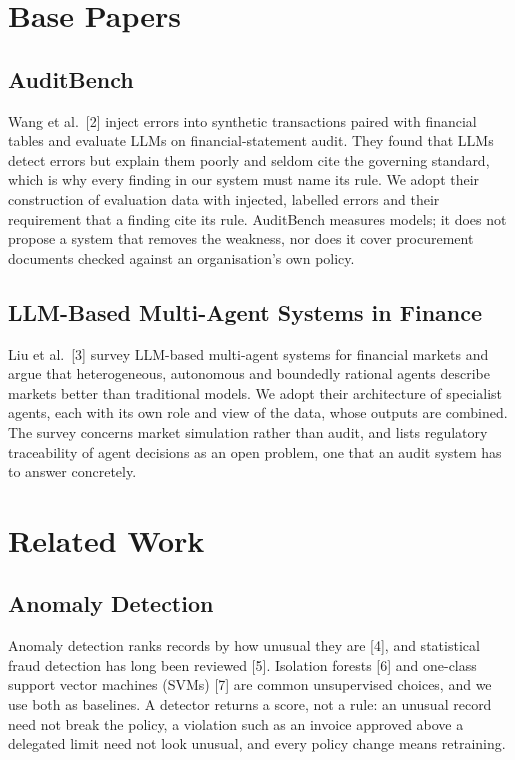 \documentclass[9pt,a4paper,twocolumn]{extarticle}
\begin{document}
\section{Base Papers}
\subsection{AuditBench}
Wang et al.~[2] inject errors into synthetic transactions paired with financial tables and evaluate LLMs on financial-statement audit. They found that LLMs detect errors but explain them poorly and seldom cite the governing standard, which is why every finding in our system must name its rule. We adopt their construction of evaluation data with injected, labelled errors and their requirement that a finding cite its rule. AuditBench measures models; it does not propose a system that removes the weakness, nor does it cover procurement documents checked against an organisation's own policy.

\subsection{LLM-Based Multi-Agent Systems in Finance}
Liu et al.~[3] survey LLM-based multi-agent systems for financial markets and argue that heterogeneous, autonomous and boundedly rational agents describe markets better than traditional models. We adopt their architecture of specialist agents, each with its own role and view of the data, whose outputs are combined. The survey concerns market simulation rather than audit, and lists regulatory traceability of agent decisions as an open problem, one that an audit system has to answer concretely.

\section{Related Work}
\subsection{Anomaly Detection}
Anomaly detection ranks records by how unusual they are [4], and statistical fraud detection has long been reviewed [5]. Isolation forests [6] and one-class support vector machines (SVMs) [7] are common unsupervised choices, and we use both as baselines. A detector returns a score, not a rule: an unusual record need not break the policy, a violation such as an invoice approved above a delegated limit need not look unusual, and every policy change means retraining.
\end{document}

